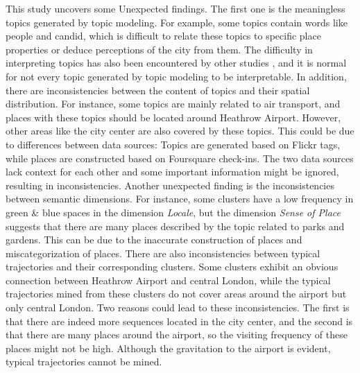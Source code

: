 \documentclass{article}
\theoremstyle{remark}
\begin{document}
This study uncovers some Unexpected findings. The first one is the meaningless topics generated by topic modeling. For example, some topics contain words like people and candid, which is difficult to relate these topics to specific place properties or deduce perceptions of the city from them. The difficulty in interpreting topics has also been encountered by other studies \cite{bahrehdar_description_2018,sui_inferring_2013}, and it is normal for not every topic generated by topic modeling to be interpretable. In addition, there are inconsistencies between the content of topics and their spatial distribution. For instance, some topics are mainly related to air transport, and places with these topics should be located around Heathrow Airport. However, other areas like the city center are also covered by these topics. This could be due to differences between data sources: Topics are generated based on Flickr tags, while places are constructed based on Foursquare check-ins. The two data sources lack context for each other and some important information might be ignored, resulting in inconsistencies. Another unexpected finding is the inconsistencies between semantic dimensions. For instance, some clusters have a low frequency in green \& blue spaces in the dimension \textit{Locale}, but the dimension \textit{Sense of Place} suggests that there are many places described by the topic related to parks and gardens. This can be due to the inaccurate construction of places and miscategorization of places. There are also inconsistencies between typical trajectories and their corresponding clusters. Some clusters exhibit an obvious connection between Heathrow Airport and central London, while the typical trajectories mined from these clusters do not cover areas around the airport but only central London. Two reasons could lead to these inconsistencies. The first is that there are indeed more sequences located in the city center, and the second is that there are many places around the airport, so the visiting frequency of these places might not be high. Although the gravitation to the airport is evident, typical trajectories cannot be mined.
\end{document}
